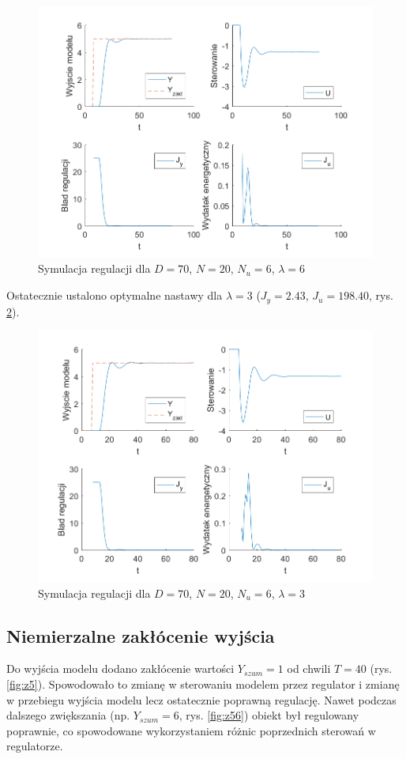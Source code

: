 \documentclass[a4paper, 10pt]{article}
\begin{document}
		\begin{figure}[H]
					\centering
					\includegraphics[width=0.9\linewidth]{z4_70_20_6_6}
					\caption{Symulacja regulacji dla $D=70$, $N=20$, $N_u=6$, $\lambda=6$}
					\label{fig:z4_3}
					\end{figure}
					
	Ostatecznie ustalono optymalne nastawy dla $\lambda = 3$ ($J_y=2.43$, $J_u=198.40$, rys. \ref{fig:z4_4}).
	
	\begin{figure}[H]
				\centering
				\includegraphics[width=0.9\linewidth]{z4_70_20_6_3}
				\caption{Symulacja regulacji dla $D=70$, $N=20$, $N_u=6$, $\lambda=3$}
				\label{fig:z4_4}
				\end{figure}
				
	\subsection{Niemierzalne zakłócenie wyjścia}
	Do wyjścia modelu dodano zakłócenie wartości $Y_{szum} = 1$ od chwili $T=40$ (rys. \ref{fig:z5}). Spowodowało to zmianę w sterowaniu modelem przez regulator i zmianę w przebiegu wyjścia modelu lecz ostatecznie poprawną regulację. Nawet podczas dalszego zwiększania (np. $Y_{szum}=6$, rys. \ref{fig:z56}) obiekt był regulowany poprawnie, co spowodowane wykorzystaniem różnic poprzednich sterowań w regulatorze.
	
\end{document}
